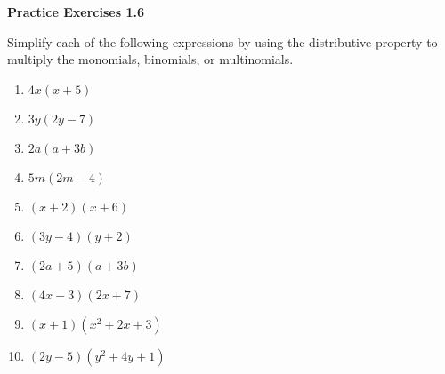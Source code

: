 \vspace{1ex}
\noindent\textbf{Practice Exercises 1.6}


Simplify each of the following expressions by using the distributive property to multiply the monomials, binomials, or multinomials.
\begin{multicols}{2}
\begin{enumerate}
    \item \( 4x(x + 5) \)
    \item \( 3y(2y - 7) \)
    \item \( 2a(a + 3b) \)
    \item \( 5m(2m - 4) \)
    \item \( (x + 2)(x + 6) \)
    \item \( (3y - 4)(y + 2) \)
    \item \( (2a + 5)(a + 3b) \)
    \item \( (4x - 3)(2x + 7) \)
    \item \( (x + 1)(x^2 + 2x + 3) \)
    \item \( (2y - 5)(y^2 + 4y + 1) \)
\end{enumerate}
\end{multicols} 